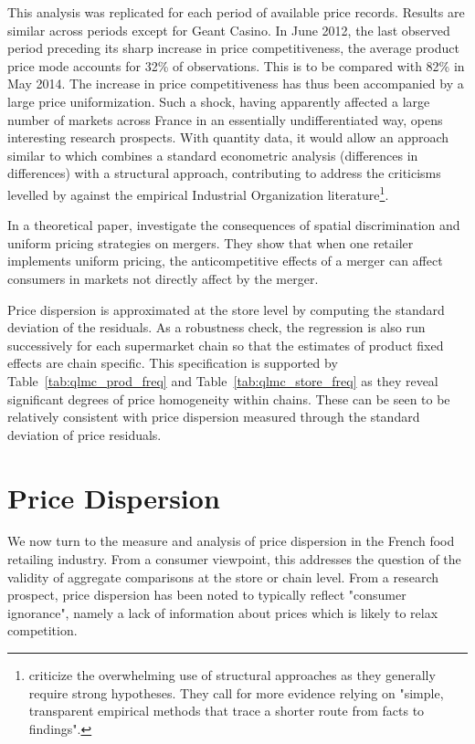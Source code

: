 \documentclass[english]{article}
\begin{document}
This analysis was replicated for each period of available price records. Results are similar across periods except for Geant Casino. In June 2012, the last observed period preceding its sharp increase in price competitiveness, the average product price mode accounts for 32\% of observations. This is to be compared with 82\% in May 2014. The increase in price competitiveness has thus been accompanied by a large price uniformization. Such a shock, having apparently affected a large number of markets across France in an essentially undifferentiated way, opens interesting research prospects. With quantity data, it would allow an approach similar to \cite{ALL16b} which combines a standard econometric analysis (differences in differences) with a structural approach, contributing to address the criticisms levelled by \cite{ANG10} against the empirical Industrial Organization literature\footnote{\cite{ANG10} criticize the overwhelming use of structural approaches as they generally require strong hypotheses. They call for more evidence relying on "simple, transparent empirical methods that trace a shorter route from facts to findings".}.

In a theoretical paper, \cite{ALL16a} investigate the consequences of spatial discrimination and uniform pricing strategies on mergers. They show that when one retailer implements uniform pricing, the anticompetitive effects of a merger can affect consumers in markets not directly affect by the merger.

Price dispersion is approximated at the store level by computing the standard deviation of the residuals. As a robustness check, the regression is also run successively for each supermarket chain so that the estimates of product fixed effects are chain specific. This specification is supported by Table~\ref{tab:qlmc_prod_freq} and Table~\ref{tab:qlmc_store_freq} as they reveal significant degrees of price homogeneity within chains. These can be seen to be relatively consistent with price dispersion measured through the standard deviation of price residuals.

\section{Price Dispersion}

We now turn to the measure and analysis of price dispersion in the French food retailing industry. From a consumer viewpoint, this addresses the question of the validity of aggregate comparisons at the store or chain level. From a research prospect, price dispersion has been noted to typically reflect "consumer ignorance", namely a lack of information about prices which is likely to relax competition.
\end{document}
